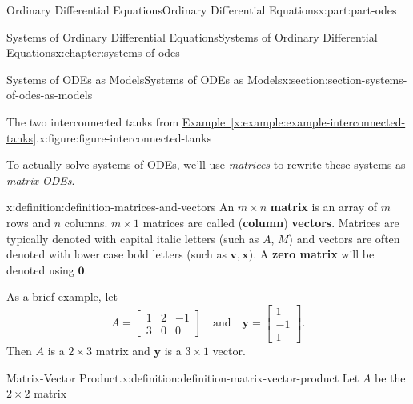 \documentclass[twoside,10pt,]{book}
\newcommand{\xreffont}{\relax}
\newcommand{\terminology}[1]{\textbf{#1}}
\numberwithin{equation}{part}
\renewcommand{\vec}[1]{\mathbf{#1}}
\newcommand{\amp}{&}
\begin{document}
\begin{partptx}{Ordinary Differential Equations}{}{Ordinary Differential Equations}{}{}{x:part:part-odes}
\begin{chapterptx}{Systems of Ordinary Differential Equations}{}{Systems of Ordinary Differential Equations}{}{}{x:chapter:systems-of-odes}
\begin{sectionptx}{Systems of ODEs as Models}{}{Systems of ODEs as Models}{}{}{x:section:section-systems-of-odes-as-models}
\begin{figureptx}{The two interconnected tanks from \hyperref[x:example:example-interconnected-tanks]{Example~{\xreffont\ref{x:example:example-interconnected-tanks}}}.}{x:figure:figure-interconnected-tanks}{}
\begin{image}{0}{1}{0}
{
}%
\end{image}%
\tcblower
\end{figureptx}%
To actually solve systems of ODEs, we'll use \emph{matrices} to rewrite these systems as \emph{matrix ODEs}.%
\begin{definition}{}{x:definition:definition-matrices-and-vectors}%
%
%
An \(m\times n\) \terminology{matrix} is an array of \(m\) rows and \(n\) columns. \(m\times1\) matrices are called (\terminology{column}) \terminology{vectors}. Matrices are typically denoted with capital italic letters (such as \(A\), \(M\)) and vectors are often denoted with lower case bold letters (such as \(\vec{v},\vec{x})\). A \terminology{zero matrix} will be denoted using \(\vec{0}\).%
\end{definition}
As a brief example, let%
\begin{equation*}
A = \begin{bmatrix} 1\amp2\amp-1\\3\amp0\amp0\end{bmatrix}\quad\text{and}\quad \vec{y} = \begin{bmatrix} 1\\-1\\1 \end{bmatrix}.
\end{equation*}
Then \(A\) is a \(2\times3\) matrix and \(\vec{y}\) is a \(3\times 1\) vector.%
\begin{definition}{Matrix-Vector Product.}{x:definition:definition-matrix-vector-product}%
Let \(A\) be the \(2\times 2\) matrix%
\begin{equation*}

\end{equation*}
\end{definition}
\end{sectionptx}
\end{chapterptx}
\end{partptx}
\end{document}
